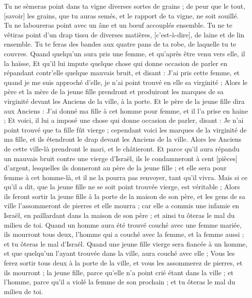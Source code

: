 \begin{multicols}{2}
Tu ne sèmeras point dans ta vigne diverses sortes de grains ; de peur que le tout, [savoir] les grains, que tu auras semés, et le rapport de ta vigne, ne soit souillé.
Tu ne laboureras point avec un âne et un bœuf accouplés ensemble.
Tu ne te vêtiras point d'un drap tissu de diverses matières, [c'est-à-dire], de laine et de lin ensemble.
Tu te feras des bandes aux quatre pans de ta robe, de laquelle tu te couvres.
Quand quelqu'un aura pris une femme, et qu'après être venu vers elle, il la haïsse,
Et qu'il lui impute quelque chose qui donne occasion de parler en répandant contr'elle quelque mauvais bruit, et disant : J'ai pris cette femme, et quand je me suis approché d'elle, je n'ai point trouvé en elle sa virginité ;
Alors le père et la mère de la jeune fille prendront et produiront les marques de sa virginité devant les Anciens de la ville, à la porte.
Et le père de la jeune fille dira aux Anciens : J'ai donné ma fille à cet homme pour femme, et il l'a prise en haine ;
Et voici, il lui a imposé une chose qui donne occasion de parler, disant : Je n'ai point trouvé que ta fille fût vierge ; cependant voici les marques de la virginité de ma fille, et ils étendront le drap devant les Anciens de la ville.
Alors les Anciens de cette ville-là prendront le mari, et le châtieront.
Et parce qu'il aura répandu un mauvais bruit contre une vierge d'Israël, ils le condamneront à cent [pièces] d'argent, lesquelles ils donneront au père de la jeune fille ; et elle sera pour femme à cet homme-là, et il ne la pourra pas renvoyer, tant qu'il vivra.
Mais si ce qu'il a dit, que la jeune fille ne se soit point trouvée vierge, est véritable ;
Alors ils feront sortir la jeune fille à la porte de la maison de son père, et les gens de sa ville l'assommeront de pierres et elle mourra ; car elle a commis une infamie en Israël, en paillardant dans la maison de son père ; et ainsi tu ôteras le mal du milieu de toi.
Quand un homme aura été trouvé couché avec une femme mariée, ils mourront tous deux, l'homme qui a couché avec la femme, et la femme aussi ; et tu ôteras le mal d'Israël.
Quand une jeune fille vierge sera fiancée à un homme, et que quelqu'un l'ayant trouvée dans la ville, aura couché avec elle ;
Vous les ferez sortir tous deux à la porte de la ville, et vous les assommerez de pierres, et ils mourront ; la jeune fille, parce qu'elle n'a point crié étant dans la ville ; et l'homme, parce qu'il a violé la femme de son prochain ; et tu ôteras le mal du milieu de toi.

\end{multicols}
